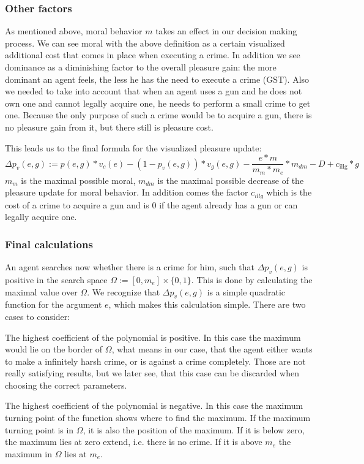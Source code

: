 \documentclass{JASSS}
\begin{document}
    \subsubsection{Other factors}

    As mentioned above, moral behavior $m$ takes an effect in our decision making process. We can see moral with the above definition as a certain visualized additional cost that comes in place when executing a crime.
    In addition we see dominance as a diminishing factor to the overall pleasure gain: the more dominant an agent feels, the less he has the need to execute a crime (GST).
    Also we needed to take into account that when an agent uses a gun and he does not own one and cannot legally acquire one, he needs to perform a small crime to get one. Because the only purpose of such a crime would be to acquire a gun, there is no pleasure gain from it, but there still is pleasure cost.
    \label{otherFactors}

    This leads us to the final formula for the visualized pleasure update:
    $$
    	\Delta p_v(e,g) := p(e,g)*v_c(e) - (1-p_v(e,g)) * v_g(e, g) - \frac{e*m}{m_m * m_e}*m_{dm} - D + c_{\text{illg}}*g
    $$
    $m_m$ is the maximal possible moral, $m_{dm}$ is the maximal possible decrease of the pleasure update for moral behavior. In addition comes the factor $c_{illg}$ which is the cost of a crime to acquire a gun and is 0 if the agent already has a gun or can legally acquire one.

    \subsubsection{Final calculations}

    An agent searches now whether there is a crime for him, such that $\Delta p_v(e,g)$ is positive in the search space $\Omega := [0, m_e] \times \{0,1\}$. This is done by calculating the maximal value over $\Omega$.
    We recognize that $\Delta p_v(e,g)$ is a simple quadratic function for the argument $e$, which makes this calculation simple.
    There are two cases to consider:
    \begin{enumerate*}
    	\item The highest coefficient of the polynomial is positive. In this case the maximum would lie on the border of $\Omega$, what means in our case, that the agent either wants to make a infinitely harsh crime, or is against a crime completely.
    	Those are not really satisfying results, but we later see, that this case can be discarded when choosing the correct parameters.

    	\item The highest coefficient of the polynomial is negative. In this case the maximum turning point of the function shows where to find the maximum.
    	If the maximum turning point is in $\Omega$, it is also the position of the maximum. If it is below zero, the maximum lies at zero extend, i.e. there is no crime.
    	If it is above $m_e$ the maximum in $\Omega$ lies at $m_e$.
    \end{enumerate*}
\end{document}
